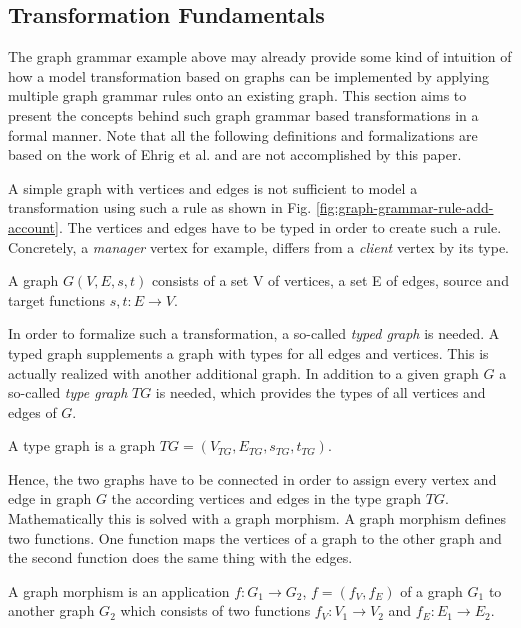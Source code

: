 \documentclass[runningheads]{llncs}
\begin{document}
\subsection{Transformation Fundamentals}
The graph grammar example above may already provide some kind of intuition of how a model transformation based on graphs can be implemented by applying multiple graph grammar rules onto an existing graph. This section aims to present the concepts behind such graph grammar based transformations in a formal manner. Note that all the following definitions and formalizations are based on the work of Ehrig et al. \cite{DBLP:series/eatcs/EhrigEPT06} and are not accomplished by this paper.

A simple graph with vertices and edges is not sufficient to model a transformation using such a rule as shown in Fig. \ref{fig:graph-grammar-rule-add-account}. The vertices and edges have to be typed in order to create such a rule. Concretely, a \textit{manager} vertex for example, differs from a \textit{client} vertex by its type. 

\begin{definition}[Graph]
A graph $G(V,E,s,t)$ consists of a set V of vertices, a set E of edges, source and target functions $s,t : E \to V$.
\end{definition}

\noindent
In order to formalize such a transformation, a so-called \textit{typed graph} is needed. A typed graph supplements a graph with types for all edges and vertices. This is actually realized with another additional graph. In addition to a given graph $G$ a so-called \textit{type graph} $TG$ is needed, which provides the types of all vertices and edges of $G$.

\begin{definition}
A type graph is a graph $TG = (V_{TG},E_{TG},s_{TG},t_{TG})$.
\end{definition}

\noindent
Hence, the two graphs have to be connected in order to assign every vertex and edge in graph $G$ the according vertices and edges in the type graph $TG$. Mathematically this is solved with a graph morphism. A graph morphism defines two functions. One function maps the vertices of a graph to the other graph and the second function does the same thing with the edges.

\begin{definition}
A graph morphism is an application $f : G_1 \to G_2$, $f = (f_V,f_E)$ of a graph $G_1$ to another graph $G_2$ which consists of two functions $f_V : V_1 \to V_2$ and $f_E : E_1 \to E_2$.
\end{definition}
\end{document}
